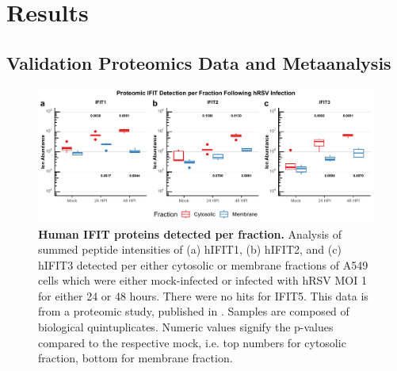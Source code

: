 \section{Results} \label{sec:Results-Chapter 1}


\subsection{Validation Proteomics Data and Metaanalysis} \label{subsec:Validation Proteomics Data and Metaanalysis}
\begin{figure}
    \centering
    \includegraphics[width=1\linewidth]{08. Chapter 3/Figs/01. Human/01. merged_proteomics.pdf}
    \caption[Human IFIT proteins detected per fraction.]{\textbf{Human IFIT proteins detected per fraction.} Analysis of summed peptide intensities of (a) hIFIT1, (b) hIFIT2, and (c) hIFIT3 detected per either cytosolic or membrane fractions of A549 cells which were either mock-infected or infected with hRSV MOI 1 for either 24 or 48 hours. There were no hits for IFIT5. This data is from a proteomic study, published in \cite{Jobe2023ViralCondensates}. Samples are composed of biological quintuplicates. Numeric values signify the p-values compared to the respective mock, i.e. top numbers for cytosolic fraction, bottom for membrane fraction.}
    \label{fig:Human IFIT proteomics.}
\end{figure}


